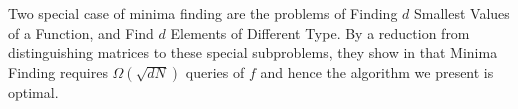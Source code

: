 \begin{note}\label{note:lb}
Two special case of minima finding are the problems of Finding $d$ Smallest Values of a Function, and Find $d$ Elements of Different Type. By a reduction from distinguishing matrices to these special subproblems, they show in \cite{durr2004quantum} that Minima Finding requires $\Omega(\sqrt{dN})$ queries of $f$ and hence the algorithm we present is optimal. 
\end{note}